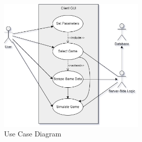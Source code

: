 \documentclass{thesis-ekf}
\theoremstyle{definition}
\theoremstyle{remark}
\begin{document}
\begin{figure}[th!]
	\centering
	\includegraphics[width=7cm]{img/usecase}
	\caption{Use Case Diagram}
	\label{img-usecase}
\end{figure}
\end{document}
